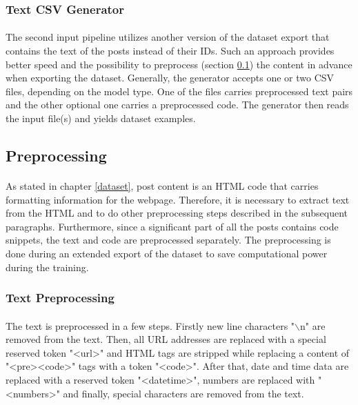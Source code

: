 \subsubsection{Text CSV Generator}
\paragraph{}
The second input pipeline utilizes another version of the dataset export that contains the text of the posts instead of their IDs. Such an approach provides better speed and the possibility to preprocess (section \ref{preprocessing}) the content in advance when exporting the dataset. Generally, the generator accepts one or two CSV files, depending on the model type. One of the files carries preprocessed text pairs and the other optional one carries a preprocessed code. The generator then reads the input file(s) and yields dataset examples.

\subsection{Preprocessing}\label{preprocessing}
\paragraph{}
As stated in chapter \ref{dataset}, post content is an HTML code that carries formatting information for the webpage. Therefore, it is necessary to extract text from the HTML and to do other preprocessing steps described in the subsequent paragraphs. Furthermore, since a significant part of all the posts contains code snippets, the text and code are preprocessed separately. The preprocessing is done during an extended export of the dataset to save computational power during the training.

\subsubsection{Text Preprocessing}
\paragraph{}
The text is preprocessed in a few steps. Firstly new line characters "$\backslash$n" are removed from the text. Then, all URL addresses are replaced with a special reserved token "<url>" and HTML tags are stripped while replacing a content of "<pre><code>" tags with a token "<code>". After that, date and time data are replaced with a reserved token "<datetime>", numbers are replaced with "<numbers>" and finally, special characters are removed from the text.

